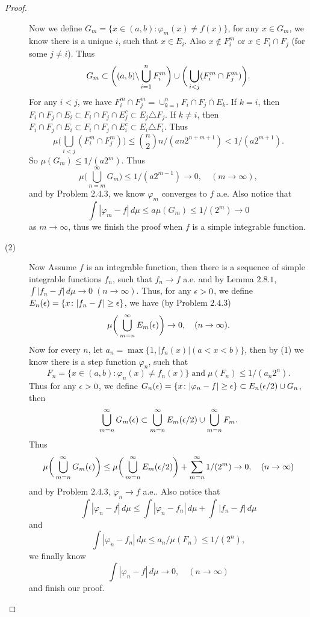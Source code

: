 \begin{proof}
\begin{description}
	Now we define $G_m=\{x\in (a,b)\colon \varphi_m(x)\neq f(x)\}$, for any $x\in G_m$, we know there is a unique $i$, such that $x\in E_i$. Also $x\notin F_i^m$ or $x\in F_i\cap F_j$ (for some $j\neq i$). Thus
	\[G_m\subset \bigg((a,b)\backslash \bigcup_{i=1}^n F_i^m\bigg)\cup \bigg(\bigcup_{i<j}(F_i^m\cap F_j^m)\bigg).\]
	For any $i<j$, we have $F_i^m\cap F_j^m=\cup_{k=1}^n F_i\cap F_j\cap E_k$.
	If $k=i$, then $F_i\cap F_j\cap E_i\subset F_i\cap F_j\cap E_j^c\subset E_j\triangle F_j$. If $k\neq i$, then $F_i\cap F_j\cap E_i\subset F_i\cap F_j\cap E_i^c\subset E_i\triangle F_i$. Thus
	\[\mu\bigg(\bigcup_{i<j}(F_i^m\cap F_j^m)\bigg)\leq \binom{n}{2}n/(an2^{n+m+1})<1/(a2^{m+1}).\]
	So $\mu(G_m)\leq 1/(a2^m)$. Thus
	\[\mu\bigg(\bigcup_{n=m}^\infty G_m\bigg)\leq 1/(a 2^{m-1})\to 0,\quad (m\to\infty),\]
	and by Problem $2.4.3$, we know $\varphi_m$ converges to $f$ a.e. Also notice that
	\[\int |\varphi_m-f|\,d\mu\leq a\mu(G_m)\leq 1/(2^m)\to 0\] as $m\to \infty$, thus we finish the proof when $f$ is a simple integrable function. 
	\item[(2)] 
	Now Assume $f$ is an  integrable function, then there is a sequence of simple integrable functions $f_n$, such that 
	$f_n\to f$ a.e. and by Lemma $2.8.1$, $\int |f_n-f|\,d\mu\to 0\;(n\to\infty)$.
	Thus, for any $\epsilon>0$, we define $E_n(\epsilon)=\{x\colon |f_n-f|\geq \epsilon\}$, we have (by Problem $2.4.3$)
	\[\mu\bigg(\bigcup_{m=n}^\infty E_m(\epsilon)\bigg)\to 0,\quad (n\to\infty).\]
	Now for every $n$, let $a_n=\max\{1,|f_n(x)|(a<x<b)\}$, then by (1) we know there is a step function $\varphi_n$, such that
	\[F_n=\{x\in (a,b)\colon \varphi_n(x)\neq f_n(x)\}\;\mbox{and}\;\mu(F_n)\leq 1/(a_n 2^n).\]
	Thus for any $\epsilon>0$, we define $G_n(\epsilon)=\{x\colon |\varphi_n-f|\geq \epsilon\}\subset E_n(\epsilon/2)\cup G_n$, then
	\[\bigcup_{m=n}^\infty G_m(\epsilon)\subset \bigcup_{m=n}^\infty E_m(\epsilon/2)\cup \bigcup_{m=n}^\infty F_m.\]
	Thus
	\[\mu\bigg(\bigcup_{m=n}^\infty G_m(\epsilon)\bigg)\leq \mu\bigg(\bigcup_{m=n}^\infty E_m(\epsilon/2)\bigg)+\sum_{m=n}^\infty 1/(2^m)\to 0,\quad (n\to \infty)\]
	and by Problem $2.4.3$, $\varphi_n\to f$ a.e.. Also notice that
	\[\int |\varphi_n-f|\,d\mu\leq \int |\varphi_n-f_n|\,d\mu+\int |f_n-f|\,d\mu\]
	and 
	\[\int |\varphi_n-f_n|\,d\mu\leq a_n/\mu(F_n)\leq 1/(2^n),\]
	we finally know
	\[\int |\varphi_n-f|\,d\mu\to 0,\quad(n\to \infty)\] and finish our proof.
\end{description}
\end{proof}

